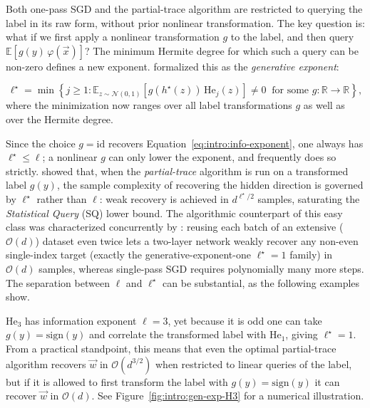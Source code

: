 Both one-pass SGD and the partial-trace algorithm are restricted to querying the label in its raw form, without prior nonlinear transformation. The key question is: what if we first apply a nonlinear transformation \(g\) to the label, and then query \(\mathbb{E}[g(y)\,\varphi(\vec{x})]\)? The minimum Hermite degree for which such a query can be non-zero defines a new exponent. \citet{damian2024computational} formalized this as the \emph{generative exponent}:
\begin{definition}
\begin{equation} \label{eq:intro:generative-exponent}
    \ell^\star = \min\left\{ j \geq 1 : \mathbb{E}_{z \sim \mathcal{N}(0,1)}\!\left[ g(h^\star(z))\,\mathrm{He}_j(z) \right] \neq 0 \ \text{ for some } g : \mathbb{R} \to \mathbb{R} \right\},
\end{equation}
where the minimization now ranges over all label transformations \(g\) as well as over the Hermite degree.
\end{definition}
Since the choice \(g = \mathrm{id}\) recovers Equation~\eqref{eq:intro:info-exponent}, one always has \(\ell^\star \leq \ell\); a nonlinear \(g\) can only lower the exponent, and frequently does so strictly.
\citet{damian2024computational} showed that, when the \emph{partial-trace} algorithm is run on a transformed label \(g(y)\), the sample complexity of recovering the hidden direction is governed by \(\ell^\star\) rather than \(\ell\): weak recovery is achieved in \(d^{\ell^\star/2}\) samples, saturating the \emph{Statistical Query} (SQ) lower bound.
The algorithmic counterpart of this easy class was characterized concurrently by \citet{dandi2024benefits}: reusing each batch of an extensive (\(\mathcal{O}(d)\)) dataset even twice lets a two-layer network weakly recover any non-even single-index target (exactly the generative-exponent-one \(\ell^\star = 1\) family) in \(\mathcal{O}(d)\) samples, whereas single-pass SGD requires polynomially many more steps.
The separation between \(\ell\) and \(\ell^\star\) can be substantial, as the following examples show.
\begin{example}[\(\mathrm{He}_3\)]
 \(\mathrm{He}_3\) has information exponent \(\ell = 3\), yet because it is odd one can take \(g(y) = \mathrm{sign}(y)\) and correlate the transformed label with \(\mathrm{He}_1\), giving \(\ell^\star = 1\).
 From a practical standpoint, this means that even the optimal partial-trace algorithm recovers \(\vec{w}\) in \(\mathcal{O}(d^{3/2})\) when restricted to linear queries of the label, but if it is allowed to first transform the label with \(g(y) = \mathrm{sign}(y)\) it can recover \(\vec{w}\) in \(\mathcal{O}(d)\). See Figure~\ref{fig:intro:gen-exp-H3} for a numerical illustration.
\end{example}
